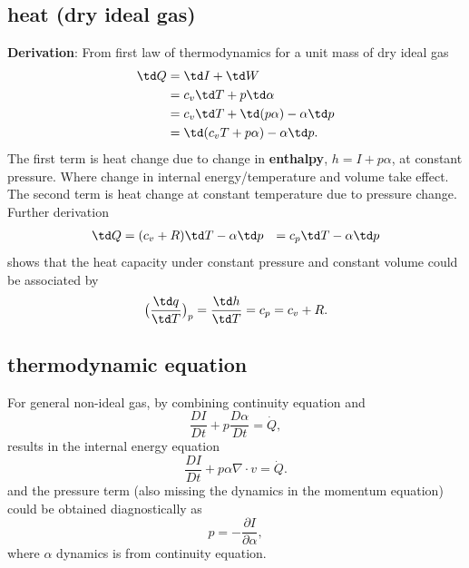 \subsection{heat (dry ideal gas)}
{\bf{Derivation}}: From first law of thermodynamics for a unit mass of dry ideal gas
\begin{equation} \label{eq:energy_cv}
\begin{aligned}
  \td Q & = \td I + \td W \\
        & = c_v \td T + p \td \alpha \\
        & = c_v \td T + \td(p\alpha) - \alpha \td p \\
        & = \td (c_v T + p\alpha) - \alpha \td p. 
\end{aligned}
\end{equation}
The first term is heat change due to change in {\bf{enthalpy}}, $h = I + p\alpha$, at constant
pressure. Where change in internal energy/temperature and volume take effect. The second
term is heat change at constant temperature due to pressure change. Further derivation 
\begin{equation} \label{eq:energy_cp}
\begin{aligned}
  \td Q & = (c_v + R) \td T - \alpha \td p
        & = c_p \td T - \alpha \td p
\end{aligned}
\end{equation}
shows that the heat capacity under constant pressure and constant volume could be associated by
\begin{equation}
  \big( \frac{\td q}{\td T} \big)_p = \frac{\td h}{\td T} =  c_p = c_v + R.
\end{equation}

\subsection{thermodynamic equation}
For general {\clr non-ideal gas}, by combining continuity equation and
\begin{equation}
    \frac{DI}{Dt} + p \frac{D\alpha}{Dt} = \dot{Q}, 
\end{equation}
results in the internal energy equation
\begin{equation}
    \boxed{\frac{DI}{Dt} + p\alpha \nabla \cdot v = \dot{Q}}.
\end{equation}
and the pressure term (also missing the dynamics in the momentum equation) could be obtained
diagnostically as
\begin{equation}
   p = -\frac{\partial I}{\partial \alpha},
\end{equation}
where $\alpha$ dynamics is from continuity equation. \\

